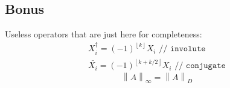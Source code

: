 \documentclass[twoside]{article}
\newcommand{\floor}[1]{{\left\lfloor{#1}\right\rfloor}}
\newcommand{\norm}[1]{{\left\lVert{#1}\right\rVert}}
\newcommand{\boxedmath}[1]{\begin{center}\boxed{$$#1$$}\end{center}
    }
\begin{document}
\begin{multicols*}{2}
        \section{Bonus}
            \par
                Useless operators that are just here for completeness:
                \begin{gather*}
                    X_i^\dagger = (-1)^\floor{k} X_i \texttt{ // involute} \\
                    \bar{X_i} = (-1)^\floor{k+k/2} X_i \texttt{ // conjugate}
                \end{gather*}
                $$ \norm{A}_\infty = \norm{A}_D $$
                \boxedmath{\begin{gathered}
                    \norm{A}_\infty = \norm{A}_P
                \end{gathered}}
    \end{multicols*}
\end{document}

